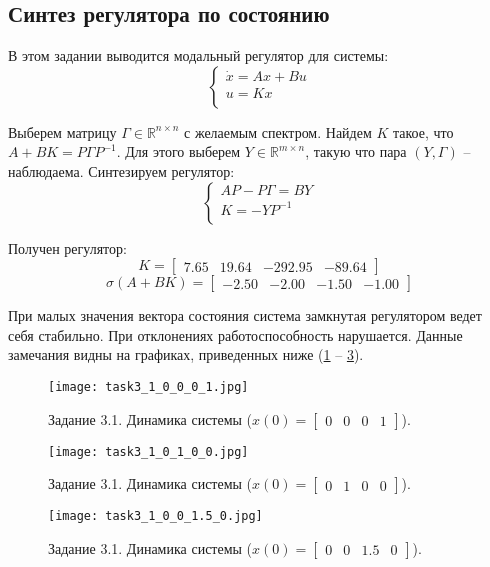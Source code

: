 \subsection{Синтез регулятора по состоянию}
В этом задании выводится модальный регулятор для системы:
\begin{equation}
    \begin{cases}
        \dot{x} = A x + Bu \\
        u = K x \\
\end{cases} 
\end{equation}

Выберем матрицу $\Gamma \in \mathbb{R}^{n \times n}$ с желаемым спектром. Найдем $K$ такое, что $A+BK = P \Gamma P^{-1}$.
Для этого выберем $Y \in \mathbb{R}^{m \times n}$, такую что пара $(Y, \Gamma)$ -- наблюдаема. Синтезируем регулятор:
\begin{equation}
        \begin{cases}
                AP - P\Gamma = BY \\
                K = -YP^{-1} \\
        \end{cases}
\end{equation}



Получен регулятор:
\[K = \begin{bmatrix}
    7.65 &  19.64 & -292.95 & -89.64
  \end{bmatrix}\]
\[\sigma(A + B K) = \begin{bmatrix}
    -2.50 & -2.00 & -1.50 & -1.00
\end{bmatrix}\]

При малых значения вектора состояния система замкнутая регулятором ведет себя стабильно. При отклонениях работоспособность нарушается. 
Данные замечания видны на графиках, приведенных ниже (\ref{fig:task3_1_0_0_0_1.jpg} -- \ref{fig:task3_1_0_0_0_1.5.jpg}).

\begin{figure}[]
  \centering
  \texttt{[image: task3\_1\_0\_0\_0\_1.jpg]}
  \caption{Задание 3.1. Динамика системы ($x(0) = \begin{bmatrix} 0 & 0 & 0 & 1 \end{bmatrix}$).}
  \label{fig:task3_1_0_0_0_1.jpg} 
\end{figure}
\begin{figure}[]
    \centering
    \texttt{[image: task3\_1\_0\_1\_0\_0.jpg]}
    \caption{Задание 3.1. Динамика системы ($x(0) = \begin{bmatrix} 0 & 1 & 0 & 0 \end{bmatrix}$).}
    \label{fig:task3_1_0_0_0_1.5.jpg}
  \end{figure}
  \begin{figure}[]
    \centering
    \texttt{[image: task3\_1\_0\_0\_1.5\_0.jpg]}
    \caption{Задание 3.1. Динамика системы ($x(0) = \begin{bmatrix} 0 & 0 & 1.5 & 0 \end{bmatrix}$).}
    \label{fig:task3_1_0_0_0_1.5.jpg}
  \end{figure}

